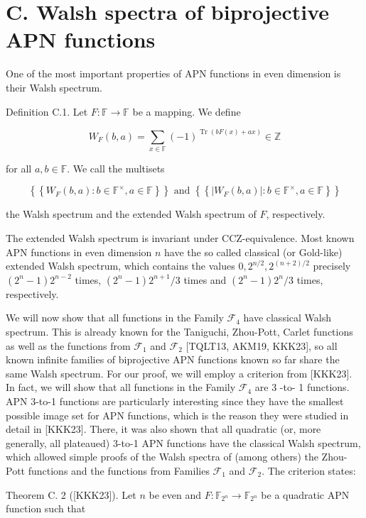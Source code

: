 \documentclass[10pt]{article}
\begin{document}
\section*{C. Walsh spectra of biprojective APN functions}
One of the most important properties of APN functions in even dimension is their Walsh spectrum.

Definition C.1. Let $F: \mathbb{F} \rightarrow \mathbb{F}$ be a mapping. We define

$$
W_{F}(b, a)=\sum_{x \in \mathbb{F}}(-1)^{\operatorname{Tr}(b F(x)+a x)} \in \mathbb{Z}
$$

for all $a, b \in \mathbb{F}$. We call the multisets

$$
\left\{\left\{W_{F}(b, a): b \in \mathbb{F}^{\times}, a \in \mathbb{F}\right\}\right\} \text { and }\left\{\left\{\left|W_{F}(b, a)\right|: b \in \mathbb{F}^{\times}, a \in \mathbb{F}\right\}\right\}
$$

the Walsh spectrum and the extended Walsh spectrum of $F$, respectively.

The extended Walsh spectrum is invariant under CCZ-equivalence. Most known APN functions in even dimension $n$ have the so called classical (or Gold-like) extended Walsh spectrum, which contains the values $0,2^{n / 2}, 2^{(n+2) / 2}$ precisely $\left(2^{n}-1\right) 2^{n-2}$ times, $\left(2^{n}-1\right) 2^{n+1} / 3$ times and $\left(2^{n}-1\right) 2^{n} / 3$ times, respectively.

We will now show that all functions in the Family $\mathcal{F}_{4}$ have classical Walsh spectrum. This is already known for the Taniguchi, Zhou-Pott, Carlet functions as well as the functions from $\mathcal{F}_{1}$ and $\mathcal{F}_{2}$ [TQLT13, AKM19, KKK23], so all known infinite families of biprojective APN functions known so far share the same Walsh spectrum. For our proof, we will employ a criterion from [KKK23]. In fact, we will show that all functions in the Family $\mathcal{F}_{4}$ are 3 -to- 1 functions. APN 3-to-1 functions are particularly interesting since they have the smallest possible image set for APN functions, which is the reason they were studied in detail in [KKK23]. There, it was also shown that all quadratic (or, more generally, all plateaued) 3-to-1 APN functions have the classical Walsh spectrum, which allowed simple proofs of the Walsh spectra of (among others) the Zhou-Pott functions and the functions from Families $\mathcal{F}_{1}$ and $\mathcal{F}_{2}$. The criterion states:

Theorem C. 2 ([KKK23]). Let $n$ be even and $F: \mathbb{F}_{2^{n}} \rightarrow \mathbb{F}_{2^{n}}$ be a quadratic APN function such that
\end{document}
